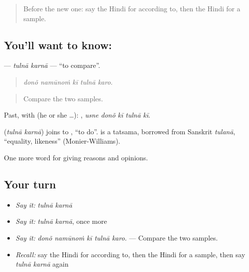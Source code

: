 \label{lesson:HI-C363-tulnakarna}



\begin{quote}
Before the new one: say the Hindi for according to, then the Hindi for a sample.
\end{quote}

\subsection*{You'll want to know:  }
\textbf{ } — \emph{tulnā karnā} — \textquotedblleft{}to compare\textquotedblright{}.

\begin{quote}
    
\end{quote}

\begin{quote}
\emph{donõ namūnoṁ kī tulnā karo.}
\end{quote}

\begin{quote}
Compare the two samples.
\end{quote}

Past, with  (he or she …):     , \emph{usne donõ kī tulnā kī}.

\begin{cousinweb}
\textbf{ } (\emph{tulnā karnā}) joins  to , \textquotedblleft{}to do\textquotedblright{}.  is a tatsama, borrowed from Sanskrit \emph{tulanā}, \textquotedblleft{}equality, likeness\textquotedblright{} (Monier-Williams).
\end{cousinweb}

\begin{grammarlens}[title={What you've built}]
One more word for giving reasons and opinions.
\end{grammarlens}

\subsection*{Your turn}
\begin{itemize}
\raggedright
  \item \emph{Say it:} \emph{tulnā karnā}
  \item \emph{Say it:} \emph{tulnā karnā}, once more
  \item \emph{Say it:} \emph{donõ namūnoṁ kī tulnā karo.} — Compare the two samples.
  \item \emph{Recall:} say the Hindi for according to, then the Hindi for a sample, then say \emph{tulnā karnā} again
\end{itemize}

